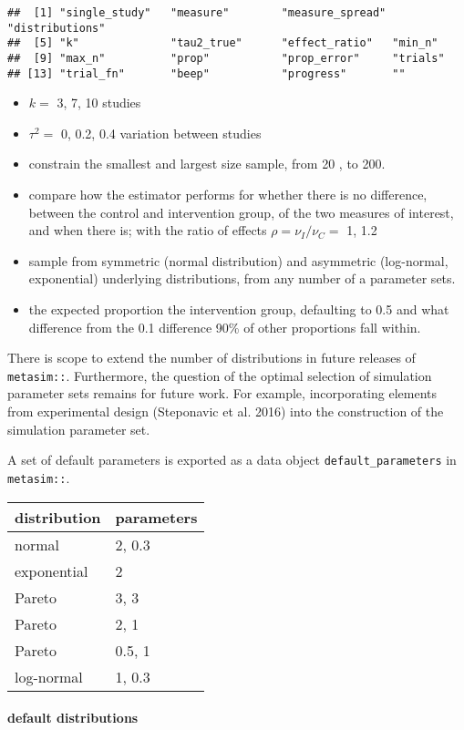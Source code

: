 \documentclass[]{article}
\providecommand{\tightlist}{%
  \setlength{\itemsep}{0pt}\setlength{\parskip}{0pt}}
\let\oldparagraph\paragraph
\renewcommand{\paragraph}[1]{\oldparagraph{#1}\mbox{}}
\begin{document}
\begin{verbatim}
##  [1] "single_study"   "measure"        "measure_spread" "distributions" 
##  [5] "k"              "tau2_true"      "effect_ratio"   "min_n"         
##  [9] "max_n"          "prop"           "prop_error"     "trials"        
## [13] "trial_fn"       "beep"           "progress"       ""
\end{verbatim}

\begin{itemize}
\tightlist
\item
  \(k =\) 3, 7, 10 studies
\item
  \(\tau^2 =\) 0, 0.2, 0.4 variation between studies
\item
  constrain the smallest and largest size sample, from 20 , to 200.
\item
  compare how the estimator performs for whether there is no difference,
  between the control and intervention group, of the two measures of
  interest, and when there is; with the ratio of effects
  \(\rho = \nu_I / \nu_C =\) 1, 1.2
\item
  sample from symmetric (normal distribution) and asymmetric
  (log-normal, exponential) underlying distributions, from any number of
  a parameter sets.
\item
  the expected proportion the intervention group, defaulting to 0.5 and
  what difference from the 0.1 difference 90\% of other proportions fall
  within.
\end{itemize}

There is scope to extend the number of distributions in future releases
of \texttt{metasim::}. Furthermore, the question of the optimal
selection of simulation parameter sets remains for future work. For
example, incorporating elements from experimental design (Steponavic et
al. 2016) into the construction of the simulation parameter set.

A set of default parameters is exported as a data object
\texttt{default\_parameters} in \texttt{metasim::}.

\begin{longtable}[]{@{}ll@{}}
\toprule
distribution & parameters\tabularnewline
\midrule
\endhead
normal & 2, 0.3\tabularnewline
exponential & 2\tabularnewline
Pareto & 3, 3\tabularnewline
Pareto & 2, 1\tabularnewline
Pareto & 0.5, 1\tabularnewline
log-normal & 1, 0.3\tabularnewline
\bottomrule
\end{longtable}

\hypertarget{default-distributions}{%
\paragraph{default distributions}\label{default-distributions}}
\end{document}
